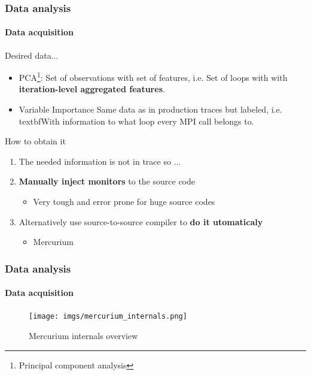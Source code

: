 \documentclass{beamer}
\begin{document}
\begin{frame}
\frametitle{Data analysis}
\framesubtitle{Data acquisition}
Desired data...\\
\begin{itemize}
\item PCA\footnote{Principal component analysis}: Set of observations with set of features, i.e. Set of loops with with \textbf{iteration-level aggregated features}. 
\item Variable Importance Same data as in production traces but labeled, i.e. textbf{With information to what loop every MPI call belongs to}.
\end{itemize}
How to obtain it\\
\begin{enumerate}
\item The needed information is not in trace so ...
\item \textbf{Manually inject monitors} to the source code
\begin{itemize}
	\item Very tough and error prone for huge source codes
\end{itemize}
\item Alternatively use source-to-source compiler to \textbf{do it utomaticaly}
\begin{itemize}
	\item Mercurium
\end{itemize}
\end{enumerate}
\end{frame}

\begin{frame}
\frametitle{Data analysis}
\framesubtitle{Data acquisition}
\begin{figure}
\texttt{[image: imgs/mercurium\_internals.png]}
\caption{Mercurium internals overview}
\end{figure}
\end{frame}
\end{document}
